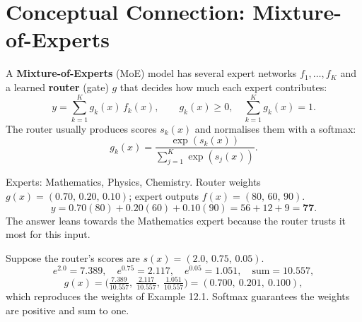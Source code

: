 \documentclass[11pt,a4paper]{article}
\begin{document}
\section{Conceptual Connection: Mixture-of-Experts}

A \textbf{Mixture-of-Experts} (MoE) model has several expert networks $f_1,\dots,f_K$ and a learned \textbf{router} (gate) $g$ that decides how much each expert contributes:
\[
y=\sum_{k=1}^Kg_k(x)\,f_k(x),\qquad g_k(x)\ge0,\quad\sum_{k=1}^Kg_k(x)=1.
\]
The router usually produces scores $s_k(x)$ and normalises them with a softmax:
\[
g_k(x)=\frac{\exp(s_k(x))}{\sum_{j=1}^K\exp(s_j(x))}.
\]

\begin{center}
\end{center}

\begin{example}
Experts: Mathematics, Physics, Chemistry. Router weights $g(x)=(0.70,\,0.20,\,0.10)$; expert outputs $f(x)=(80,\,60,\,90)$.
\[
y=0.70(80)+0.20(60)+0.10(90)=56+12+9=\mathbf{77}.
\]
The answer leans towards the Mathematics expert because the router trusts it most for this input.
\end{example}

\begin{example}
Suppose the router's scores are $s(x)=(2.0,\,0.75,\,0.05)$.
\[
e^{2.0}=7.389,\quad e^{0.75}=2.117,\quad e^{0.05}=1.051,\quad\text{sum}=10.557,
\]
\[
g(x)=\Big(\tfrac{7.389}{10.557},\ \tfrac{2.117}{10.557},\ \tfrac{1.051}{10.557}\Big)=(0.700,\ 0.201,\ 0.100),
\]
which reproduces the weights of Example 12.1. Softmax guarantees the weights are positive and sum to one.
\end{example}
\end{document}
